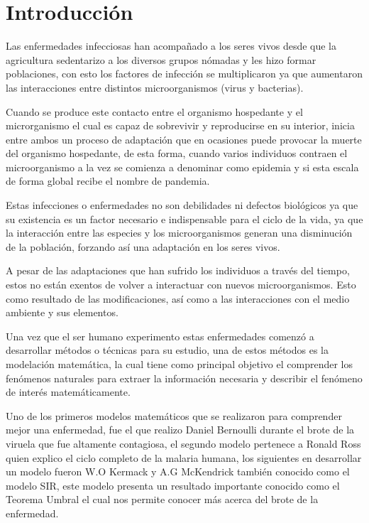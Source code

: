 \chapter*{Introducción}

Las enfermedades infecciosas han acompañado a los seres vivos desde que la agricultura sedentarizo a los diversos grupos nómadas y les hizo formar poblaciones, con esto los factores de infección se multiplicaron ya que aumentaron las interacciones entre distintos microorganismos (virus y bacterias).

Cuando se produce este contacto entre el organismo hospedante y el microrganismo el cual es capaz de sobrevivir y reproducirse en su interior, inicia entre ambos un proceso de adaptación que en ocasiones puede provocar la muerte del organismo hospedante, de esta forma, cuando varios individuos contraen el microorganismo a la vez se comienza a denominar como epidemia y si esta escala de forma global recibe el nombre de pandemia.

Estas infecciones o enfermedades no son debilidades ni defectos biológicos ya que su existencia es un factor necesario e indispensable para el ciclo de la vida, ya que la interacción entre las especies y los microorganismos generan una disminución de la población, forzando así una adaptación en los seres vivos.

A pesar de las adaptaciones que han sufrido los individuos a través del tiempo, estos no están exentos de volver a interactuar con nuevos microorganismos. Esto como resultado de las modificaciones, así como a las interacciones con el medio ambiente y sus elementos. \cite{HyFP}


Una vez que el ser humano experimento estas enfermedades comenzó a desarrollar métodos o técnicas para su estudio, una de estos métodos es la modelación matemática, la cual tiene como principal objetivo el comprender los fenómenos naturales para extraer la información necesaria y describir el fenómeno de interés matemáticamente.

Uno de los primeros modelos matemáticos que se realizaron para comprender mejor una enfermedad, fue el que realizo Daniel Bernoulli durante el brote de la viruela que fue altamente contagiosa, el segundo modelo pertenece a Ronald Ross quien explico el ciclo completo de la malaria humana, los siguientes en desarrollar un modelo fueron W.O Kermack y A.G McKendrick también conocido como el modelo SIR, este modelo presenta un resultado importante conocido como el Teorema Umbral el cual nos permite conocer más acerca del brote de la enfermedad.

